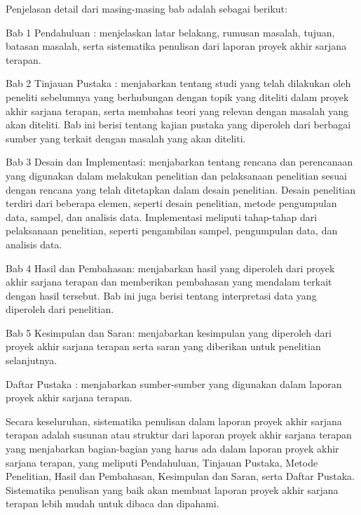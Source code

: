 Penjelasan detail dari masing-masing bab adalah sebagai berikut:

\begin{packed_enum}
    \item Bab 1 Pendahuluan : menjelaskan latar belakang, rumusan masalah, tujuan, batasan masalah, serta sistematika penulisan dari laporan proyek akhir sarjana terapan.
    \item Bab 2 Tinjauan Pustaka : menjabarkan tentang studi yang telah dilakukan oleh peneliti sebelumnya yang berhubungan dengan topik yang diteliti dalam proyek akhir sarjana terapan, serta membahas teori yang relevan dengan masalah yang akan diteliti. Bab ini berisi tentang kajian pustaka yang diperoleh dari berbagai sumber yang terkait dengan masalah yang akan diteliti.
    \item Bab 3 Desain dan Implementasi: menjabarkan tentang rencana dan perencanaan yang digunakan dalam melakukan penelitian dan pelaksanaan penelitian sesuai dengan rencana yang telah ditetapkan dalam desain penelitian. Desain penelitian terdiri dari beberapa elemen, seperti desain penelitian, metode pengumpulan data, sampel, dan analisis data. Implementasi meliputi tahap-tahap dari pelaksanaan penelitian, seperti pengambilan sampel, pengumpulan data, dan analisis data.
    \item Bab 4 Hasil dan Pembahasan: menjabarkan hasil yang diperoleh dari proyek akhir sarjana terapan dan memberikan pembahasan yang mendalam terkait dengan hasil tersebut. Bab ini juga berisi tentang interpretasi data yang diperoleh dari penelitian.
    \item Bab 5 Kesimpulan dan Saran: menjabarkan kesimpulan yang diperoleh dari proyek akhir sarjana terapan serta saran yang diberikan untuk penelitian selanjutnya.
    \item Daftar Pustaka : menjabarkan sumber-sumber yang digunakan dalam laporan proyek akhir sarjana terapan.
\end{packed_enum}

Secara keseluruhan, sistematika penulisan dalam laporan proyek akhir sarjana terapan adalah susunan atau struktur dari laporan proyek akhir sarjana terapan yang menjabarkan bagian-bagian yang harus ada dalam laporan proyek akhir sarjana terapan, yang meliputi Pendahuluan, Tinjauan Pustaka, Metode Penelitian, Hasil dan Pembahasan, Kesimpulan dan Saran, serta Daftar Pustaka. Sistematika penulisan yang baik akan membuat laporan proyek akhir sarjana terapan lebih mudah untuk dibaca dan dipahami.